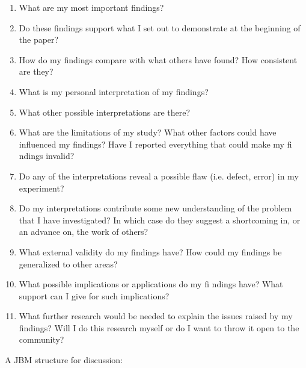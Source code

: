 \begin{enumerate}
    \item
        What are my most important findings?
    \item
        Do these findings support what I set out to demonstrate at the beginning of the
        paper?
    \item
        How do my findings compare with what others have found? How consistent are
        they?
    \item
        What is my personal interpretation of my findings?
    \item
        What other possible interpretations are there?
    \item
        What are the limitations of my study? What other factors could have influenced
        my findings? Have I reported everything that could make my fi ndings invalid?
    \item
        Do any of the interpretations reveal a possible flaw (i.e. defect, error) in my
        experiment?
    \item
        Do my interpretations contribute some new understanding of the problem that I
        have investigated? In which case do they suggest a shortcoming in, or an
        advance on, the work of others?
    \item
        What external validity do my findings have? How could my findings be 
        generalized to other areas?
    \item
        What possible implications or applications do my fi ndings have? What support
        can I give for such implications?
    \item
        What further research would be needed to explain the issues raised by my 
        findings? Will I do this research myself or do I want to throw it open to the
        community?
\end{enumerate}
    A JBM structure for discussion:

